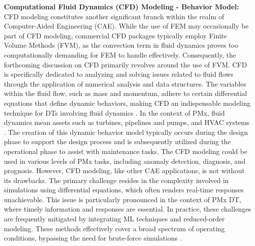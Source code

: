 \documentclass[runningheads]{llncs}
\begin{document}
\textbf{Computational Fluid Dynamics (CFD) Modeling - Behavior Model:} CFD modeling constitutes another significant branch within the realm of Computer-Aided Engineering (CAE). While the use of FEM may occasionally be part of CFD modeling, commercial CFD packages typically employ Finite Volume Methods (FVM), as the convection term in fluid dynamics proves too computationally demanding for FEM to handle effectively. Consequently, the forthcoming discussion on CFD primarily revolves around the use of FVM. CFD is specifically dedicated to analyzing and solving issues related to fluid flows through the application of numerical analysis and data structures. The variables within the fluid flow, such as mass and momentum, adhere to certain differential equations that define dynamic behaviors, making CFD an indispensable modeling technique for DTs involving fluid dynamics \cite{phanden2021review}. In the context of PMx, fluid dynamics mean assets such as turbines, pipelines and pumps, and HVAC systems \cite{deng2021bim}. The creation of this dynamic behavior model typically occurs during the design phase to support the design process and is subsequently utilized during the operational phase to assist with maintenance tasks. The CFD modeling could be used in various levels of PMx tasks, including anomaly detection, diagnosis, and prognosis. However, CFD modeling, like other CAE applications, is not without its drawbacks. The primary challenge resides in the complexity involved in simulations using differential equations, which often renders real-time responses unachievable. This issue is particularly pronounced in the context of PMx DT, where timely information and responses are essential. In practice, these challenges are frequently mitigated by integrating ML techniques and reduced-order modeling. These methods effectively cover a broad spectrum of operating conditions, bypassing the need for brute-force simulations \cite{molinaro2021embedding,aversano2019application}.\\
\end{document}
